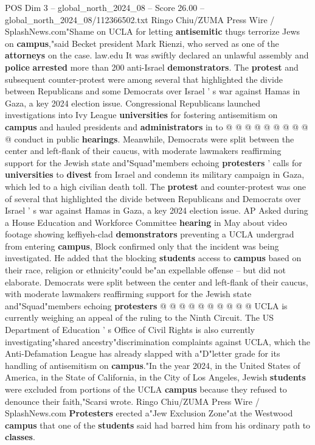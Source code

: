 \begin{textsample}{POS Dim 3 – global\_north\_2024\_08 – Score 26.00 – global\_north\_2024\_08/112366502.txt}
Ringo Chiu/ZUMA Press Wire / SplashNews.com"Shame on UCLA for letting \textbf{antisemitic} thugs terrorize Jews on \textbf{campus},"said Becket president Mark Rienzi, who served as one of the \textbf{attorneys} on the case. law.edu It was swiftly declared an unlawful assembly and \textbf{police} \textbf{arrested} more than 200 anti-Israel \textbf{demonstrators}.
The \textbf{protest} and subsequent counter-protest were among several that highlighted the divide between Republicans and some Democrats over Israel ' s war against Hamas in Gaza, a key 2024 election issue.
Congressional Republicans launched investigations into Ivy League \textbf{universities} for fostering antisemitism on \textbf{campus} and hauled presidents and \textbf{administrators} in to @ @ @ @ @ @ @ @ @ @ conduct in public \textbf{hearings}.
Meanwhile, Democrats were split between the center and left-flank of their caucus, with moderate lawmakers reaffirming support for the Jewish state and"Squad"members echoing \textbf{protesters} ' calls for \textbf{universities} to \textbf{divest} from Israel and condemn its military campaign in Gaza, which led to a high civilian death toll.
The \textbf{protest} and counter-protest was one of several that highlighted the divide between Republicans and Democrats over Israel ' s war against Hamas in Gaza, a key 2024 election issue.
AP Asked during a House Education and Workforce Committee \textbf{hearing} in May about video footage showing keffiyeh-clad \textbf{demonstrators} preventing a UCLA undergrad from entering \textbf{campus}, Block confirmed only that the incident was being investigated.
He added that the blocking \textbf{students} access to \textbf{campus} based on their race, religion or ethnicity"could be"an expellable offense -- but did not elaborate.
Democrats were split between the center and left-flank of their caucus, with moderate lawmakers reaffirming support for the Jewish state and"Squad"members echoing \textbf{protesters} @ @ @ @ @ @ @ @ @ @ UCLA is currently weighing an appeal of the ruling to the Ninth Circuit.
The US Department of Education ' s Office of Civil Rights is also currently investigating"shared ancestry"discrimination complaints against UCLA, which the Anti-Defamation League has already slapped with a"D"letter grade for its handling of antisemitism on \textbf{campus}."In the year 2024, in the United States of America, in the State of California, in the City of Los Angeles, Jewish \textbf{students} were excluded from portions of the UCLA \textbf{campus} because they refused to denounce their faith,"Scarsi wrote.
Ringo Chiu/ZUMA Press Wire / SplashNews.com \textbf{Protesters} erected a"Jew Exclusion Zone"at the Westwood \textbf{campus} that one of the \textbf{students} said had barred him from his ordinary path to \textbf{classes}.

\end{textsample}
